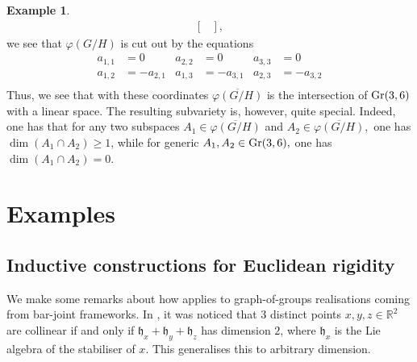 \documentclass{article}
\theoremstyle{definition}
\newtheorem{example}[theorem]{Example}
\theoremstyle{remark}
\begin{document}
\begin{example}
\begin{align*}
\begin{bmatrix}
    \end{bmatrix},
    \end{align*}
    we see that $\varphi(G/H)$ is cut out by the equations 
    \begin{equation*}
    \begin{array}{clclcl}
    a_{1,1} &=0 & a_{2,2} &=0 & a_{3,3} &=0 \\
    a_{1,2} &=-a_{2,1} & a_{1,3} &=-a_{3,1} & a_{2,3} &=-a_{3,2}\\
    \end{array}
    \end{equation*}
    Thus, we see that with these coordinates $\overline{\varphi(G/H)}$ is the intersection of $\textup{Gr}(3,6)$ with a linear space. The resulting subvariety is, however, quite special. Indeed, one has that for any two subspaces $A_1\in \overline{\varphi(G/H)}$ and $A_2\in \overline{\varphi(G/H)},$ one has $\dim(A_1\cap A_2) \geq 1$, while for generic $A_1, A_2\in \textup{Gr}(3,6),$ one has $\dim(A_1\cap A_2) =0$.
\end{example}

\section{Examples}
\subsection{Inductive constructions for Euclidean rigidity}\label{sec: inductive constructions gogs}
We make some remarks about how   applies to graph-of-groups realisations coming from bar-joint frameworks. In \cite{graphsofgroups}, it was noticed that $3$ distinct points $x,y,z\in \mathbb{R}^{2}$ are collinear if and only if $\mathfrak{h}_x + \mathfrak{h}_y + \mathfrak{h}_z$ has dimension $2$, where $\mathfrak{h}_x$ is the Lie algebra of the stabiliser of $x$. This generalises this to arbitrary dimension. 
\end{document}
